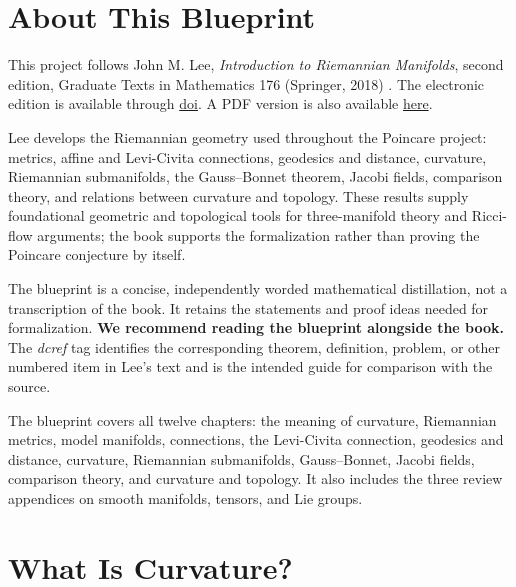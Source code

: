 


\chapter*{About This Blueprint}

This project follows John M. Lee, \emph{Introduction to Riemannian Manifolds},
second edition, Graduate Texts in Mathematics 176 (Springer, 2018)
\cite{Lee2018Riemannian}. The electronic edition is available through
\href{https://doi.org/10.1007/978-3-319-91755-9}{doi}.
A PDF version is also available
\href{https://lps.elte.hu/gomori/spacetime-geometry/readings/\%28Graduate\%20texts\%20in\%20mathematics\%20176\%29\%20Lee\%2C\%20John\%20M\%20-\%20Introduction\%20to\%20Riemannian\%20manifolds\%20\%28Corrected\%20version\%20of\%20second\%20edition\%29-Springer\%20Nature\%20\%282018\%29.pdf}{here}.

Lee develops the Riemannian geometry used throughout the Poincare project:
metrics, affine and Levi-Civita connections, geodesics and distance, curvature,
Riemannian submanifolds, the Gauss--Bonnet theorem, Jacobi fields, comparison
theory, and relations between curvature and topology. These results supply
foundational geometric and topological tools for three-manifold theory and
Ricci-flow arguments; the book supports the formalization rather than proving
the Poincare conjecture by itself.

The blueprint is a concise, independently worded mathematical distillation,
not a transcription of the book. It retains the statements and proof ideas
needed for formalization. \textbf{We recommend reading the blueprint alongside
the book.} The \emph{dcref} tag identifies the corresponding theorem,
definition, problem, or other numbered item in Lee's text and is the intended
guide for comparison with the source.

The blueprint covers all twelve chapters: the meaning of curvature, Riemannian
metrics, model manifolds, connections, the Levi-Civita connection, geodesics
and distance, curvature, Riemannian submanifolds, Gauss--Bonnet, Jacobi fields,
comparison theory, and curvature and topology. It also includes the three
review appendices on smooth manifolds, tensors, and Lie groups.

\chapter{What Is Curvature?}
\label{chap:what-is-curvature}



